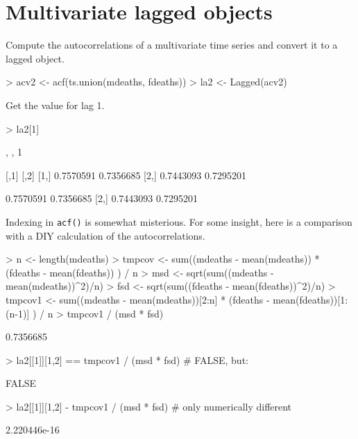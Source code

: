 \documentclass[a4paper,twoside,11pt,nojss,article]{jss}
\begin{document}
\section{Multivariate lagged objects}
\label{sec:orgbe9bdc2}

Compute the autocorrelations of a multivariate time series and convert it to a lagged object.
\begin{Schunk}
\begin{Sinput}
> acv2 <- acf(ts.union(mdeaths, fdeaths))
> la2 <- Lagged(acv2)
\end{Sinput}
\end{Schunk}

Get the value for lag 1.
\begin{Schunk}
\begin{Sinput}
> la2[1]
\end{Sinput}
\begin{Soutput}
, , 1

          [,1]      [,2]
[1,] 0.7570591 0.7356685
[2,] 0.7443093 0.7295201
\end{Soutput}
\begin{Soutput}
          [,1]      [,2]
[1,] 0.7570591 0.7356685
[2,] 0.7443093 0.7295201
\end{Soutput}
\end{Schunk}

Indexing in \texttt{acf()} is somewhat misterious. For some insight, here is a comparison with a DIY
calculation of the autocorrelations.
\begin{Schunk}
\begin{Sinput}
> n <- length(mdeaths)
> tmpcov <- sum((mdeaths - mean(mdeaths)) * (fdeaths - mean(fdeaths)) ) / n
> msd <- sqrt(sum((mdeaths - mean(mdeaths))^2)/n)
> fsd <- sqrt(sum((fdeaths - mean(fdeaths))^2)/n)
> tmpcov1 <- sum((mdeaths - mean(mdeaths))[2:n] * (fdeaths - mean(fdeaths))[1:(n-1)] ) / n
> tmpcov1 / (msd * fsd)
\end{Sinput}
\begin{Soutput}
[1] 0.7356685
\end{Soutput}
\begin{Sinput}
> la2[[1]][1,2] == tmpcov1 / (msd * fsd) # FALSE, but:
\end{Sinput}
\begin{Soutput}
[1] FALSE
\end{Soutput}
\begin{Sinput}
> la2[[1]][1,2] - tmpcov1 / (msd * fsd)  # only numerically different
\end{Sinput}
\begin{Soutput}
[1] 2.220446e-16
\end{Soutput}
\end{Schunk}
\end{document}
